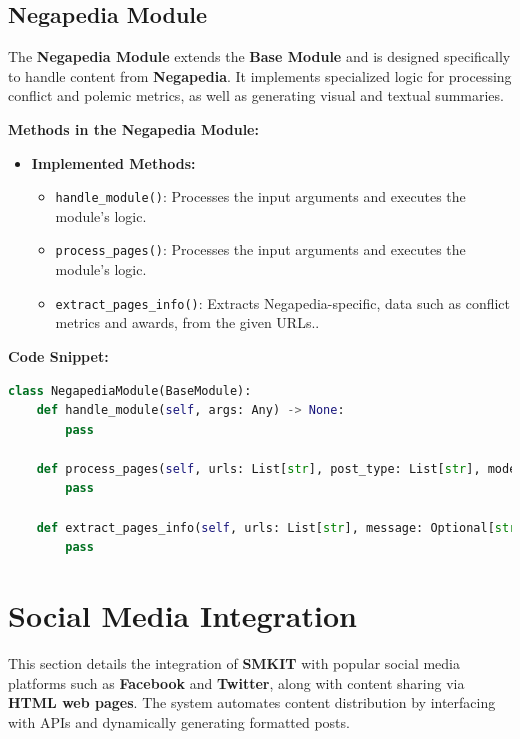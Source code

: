 \subsection{Negapedia Module}
\label{subsec:negapedia_module}
The \textbf{Negapedia Module} extends the \textbf{Base Module} and is designed specifically to handle content from \textbf{Negapedia}. It implements specialized logic for processing conflict and polemic metrics, as well as generating visual and textual summaries.

\textbf{Methods in the Negapedia Module:}
\begin{itemize}
    \item \textbf{Implemented Methods:}
    \begin{itemize}
        \item \texttt{handle\_module()}: Processes the input arguments and executes the module's logic.
        \item \texttt{process\_pages()}: Processes the input arguments and executes the module's logic.
        \item \texttt{extract\_pages\_info()}: Extracts Negapedia-specific, data such as conflict metrics and awards, from the given URLs..
    \end{itemize}
\end{itemize}

\textbf{Code Snippet:}
\begin{lstlisting}[language=Python, caption={Negapedia Module}, label={lst:negapedia_module}]
class NegapediaModule(BaseModule):
    def handle_module(self, args: Any) -> None:
        pass
    
    def process_pages(self, urls: List[str], post_type: List[str], mode: str, remove_suffix: Optional[bool], base_directory: Optional[str], base_url: Optional[str], minimum_article_modified_date: Optional[str], message: Optional[str]) -> None:
        pass
    
    def extract_pages_info(self, urls: List[str], message: Optional[str], mode: str) -> List[NegapediaPageInfo]:
        pass
\end{lstlisting}


\section{Social Media Integration}
\label{sec:social_media_integration}
This section details the integration of \textbf{SMKIT} with popular social media platforms such as \textbf{Facebook} and \textbf{Twitter}, along with content sharing via \textbf{HTML web pages}. The system automates content distribution by interfacing with APIs and dynamically generating formatted posts.

